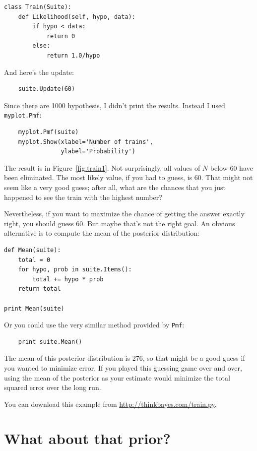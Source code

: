 \documentclass[12pt]{book}
\begin{document}
\begin{verbatim}
class Train(Suite):
    def Likelihood(self, hypo, data):
        if hypo < data:
            return 0
        else:
            return 1.0/hypo
\end{verbatim}

And here's the update:

\begin{verbatim}
    suite.Update(60)
\end{verbatim}

Since there are 1000 hypothesis, I didn't print the results.
Instead I used {\tt myplot.Pmf}:

\begin{verbatim}
    myplot.Pmf(suite)
    myplot.Show(xlabel='Number of trains',
                ylabel='Probability')
\end{verbatim}

The result is in Figure~\ref{fig.train1}.  Not surprisingly, all
values of $N$ below 60 have been eliminated.  The most likely
value, if you had to guess, is 60.  That might not seem like
a very good guess; after all, what are the chances that you just
happened to see the train with the highest number?

Nevertheless, if you want to maximize the chance of getting
the answer exactly right, you should guess 60.  But maybe that's
not the right goal.  An obvious alternative is to compute the
mean of the posterior distribution:

\begin{verbatim}
def Mean(suite):
    total = 0
    for hypo, prob in suite.Items():
        total += hypo * prob
    return total

print Mean(suite)
\end{verbatim}

Or you could use the very similar method provided by {\tt Pmf}:

\begin{verbatim}
    print suite.Mean()
\end{verbatim}

The mean of this posterior distribution is 276, so that might be a
good guess if you wanted to minimize error.  If you played this
guessing game over and over, using the mean of the posterior as your
estimate would minimize the total squared error over the long run.

You can download this example from \url{http://thinkbayes.com/train.py}.


\section{What about that prior?}
\end{document}
